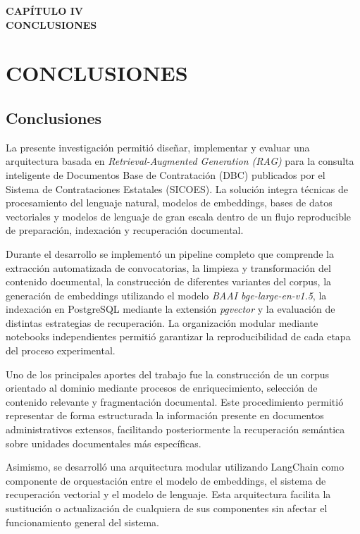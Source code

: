 \newpage
\thispagestyle{empty}
\vspace*{0.35\textheight}
\begin{center}
    {\Huge\textbf{CAPÍTULO IV}} \\[0.5cm]
    {\Huge\textbf{CONCLUSIONES}}
\end{center}

\newpage
\chapter{CONCLUSIONES}

\section{Conclusiones}

La presente investigación permitió diseñar, implementar y evaluar una arquitectura basada en \textit{Retrieval-Augmented Generation (RAG)} para la consulta inteligente de Documentos Base de Contratación (DBC) publicados por el Sistema de Contrataciones Estatales (SICOES). La solución integra técnicas de procesamiento del lenguaje natural, modelos de embeddings, bases de datos vectoriales y modelos de lenguaje de gran escala dentro de un flujo reproducible de preparación, indexación y recuperación documental.

Durante el desarrollo se implementó un pipeline completo que comprende la extracción automatizada de convocatorias, la limpieza y transformación del contenido documental, la construcción de diferentes variantes del corpus, la generación de embeddings utilizando el modelo \textit{BAAI bge-large-en-v1.5}, la indexación en PostgreSQL mediante la extensión \textit{pgvector} y la evaluación de distintas estrategias de recuperación. La organización modular mediante notebooks independientes permitió garantizar la reproducibilidad de cada etapa del proceso experimental.

Uno de los principales aportes del trabajo fue la construcción de un corpus orientado al dominio mediante procesos de enriquecimiento, selección de contenido relevante y fragmentación documental. Este procedimiento permitió representar de forma estructurada la información presente en documentos administrativos extensos, facilitando posteriormente la recuperación semántica sobre unidades documentales más específicas.

Asimismo, se desarrolló una arquitectura modular utilizando LangChain como componente de orquestación entre el modelo de embeddings, el sistema de recuperación vectorial y el modelo de lenguaje. Esta arquitectura facilita la sustitución o actualización de cualquiera de sus componentes sin afectar el funcionamiento general del sistema.

